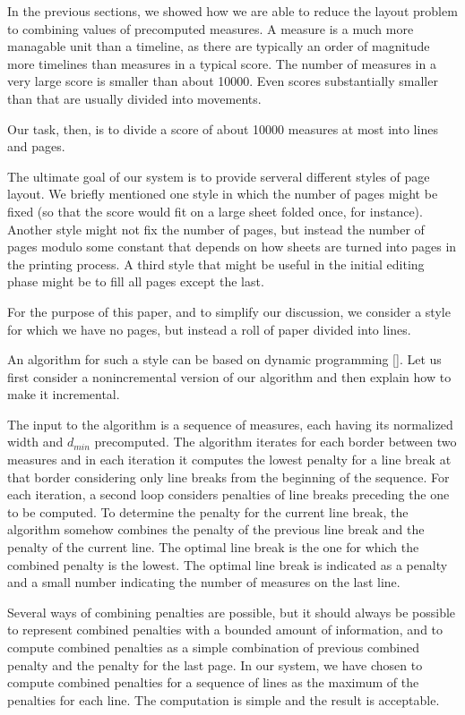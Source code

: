 \documentclass{article}
\begin{document}
In the previous sections, we showed how we are able to reduce the
layout problem to combining values of precomputed measures.  A measure
is a much more managable unit than a timeline, as there are typically
an order of magnitude more timelines than measures in a typical score.
The number of measures in a very large score is smaller than about
10000.  Even scores substantially smaller than that are usually
divided into movements. 

Our task, then, is to divide a score of about 10000 measures at most
into lines and pages. 

The ultimate goal of our system is to provide serveral different
styles of page layout.  We briefly mentioned one style in which the
number of pages might be fixed (so that the score would fit on a large
sheet folded once, for instance).  Another style might not fix the
number of pages, but instead the number of pages modulo some constant
that depends on how sheets are turned into pages in the printing
process.  A third style that might be useful in the initial editing
phase might be to fill all pages except the last.

For the purpose of this paper, and to simplify our discussion, we
consider a style for which we have no pages, but instead a roll of
paper divided into lines. 

An algorithm for such a style can be based on dynamic programming [].
Let us first consider a nonincremental version of our algorithm and
then explain how to make it incremental.

The input to the algorithm is a sequence of measures, each having its
normalized width and $d_{min}$ precomputed.  The algorithm iterates
for each border between two measures and in each iteration it computes
the lowest penalty for a line break at that border considering only
line breaks from the beginning of the sequence.  For each iteration, a
second loop considers penalties of line breaks preceding the one to be
computed.  To determine the penalty for the current line break, the
algorithm somehow combines the penalty of the previous line break and
the penalty of the current line.  The optimal line break is the one
for which the combined penalty is the lowest.  The optimal line break
is indicated as a penalty and a small number indicating the number of
measures on the last line.

Several ways of combining penalties are possible, but it should always
be possible to represent combined penalties with a bounded amount of
information, and to compute combined penalties as a simple combination
of previous combined penalty and the penalty for the last page.  In
our system, we have chosen to compute combined penalties for a
sequence of lines as the maximum of the penalties for each line.  The
computation is simple and the result is acceptable. 
\end{document}
